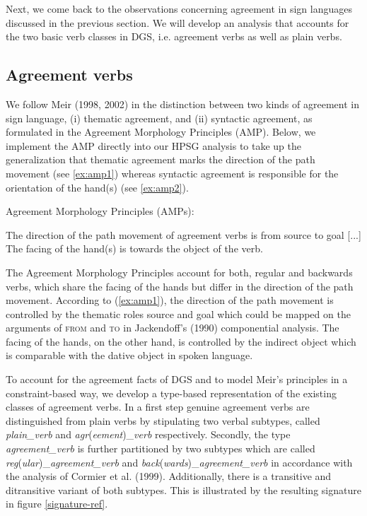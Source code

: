 \documentclass[11pt,a4paper,fleqn]{article}
\begin{document}
Next, we come back to the observations concerning agreement in sign languages discussed in the previous section. We will develop an analysis that accounts for the two basic verb classes in DGS, i.e. agreement verbs as well as plain verbs. 


\subsection{Agreement verbs}
We follow Meir (1998, 2002) in the distinction between two kinds of agreement in sign language, (i) thematic agreement, and (ii) syntactic agreement, as formulated in the Agreement Morphology Principles (AMP). Below, we implement the AMP directly into our HPSG analysis to take up the generalization that thematic agreement marks the direction of the path movement (see \ref{ex:amp1}) whereas syntactic agreement is responsible for the orientation of the hand(s) (see \ref{ex:amp2}). 

\begin{exe}
\ex  Agreement Morphology Principles (AMPs):\label{ex:amp}
\begin{xlist}	

\ex The direction of the path movement of agreement verbs is from source to goal [...] \label{ex:amp1}
\ex The facing of the hand(s) is towards the object of the verb.\label{ex:amp2}

\end{xlist}
\end{exe}

The Agreement Morphology Principles account for both, regular and backwards verbs, which share the facing of the hands but differ in the direction of the path movement. According to (\ref{ex:amp1}), the direction of the path movement is controlled by the thematic roles source and goal which could be mapped on the arguments of \textsc{from} and \textsc{to} in Jackendoff's (1990) componential analysis. The facing of the hands, on the other hand, is controlled by the indirect object which is comparable with the dative object in spoken language. 

To account for the agreement facts of DGS and to model Meir’s principles in a constraint-based way, we 
develop a type-based representation of the existing classes of agreement verbs. In a first step  genuine agreement verbs are distinguished from plain verbs by stipulating two verbal subtypes, called \textit{plain\_verb} and  \textit{agr}(\textit{eement})\_\textit{verb} respectively. Secondly, the type \textit{agreement\_verb} is further  partitioned by two subtypes which are called \textit{reg}(\textit{ular})\_\textit{agreement\_verb} and \textit{back}(\textit{wards})\_\textit{agreement\_verb} in accordance with the analysis of Cormier et al. (1999). Additionally, there is a transitive and ditransitive variant of both subtypes. This is illustrated by the resulting signature in figure \ref{signature-ref}.
\end{document}
